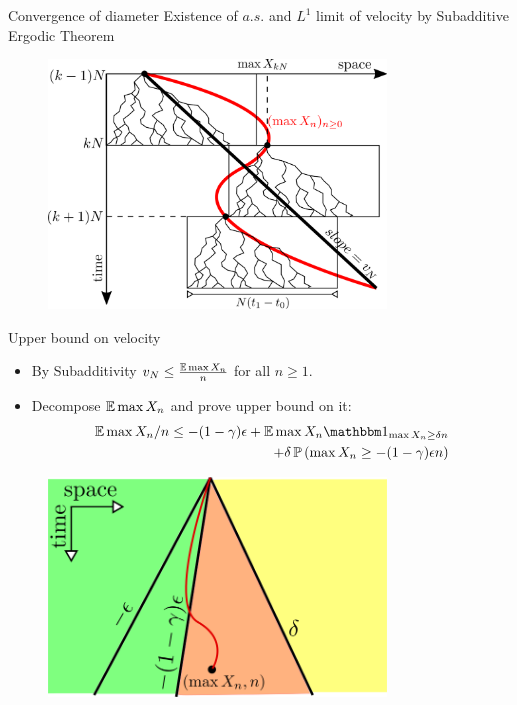 \documentclass{beamer}
\begin{document}
\begin{frame}{Convergence of diameter}
Existence of $a.s.$ and $L^1$ limit of velocity by Subadditive Ergodic Theorem

\begin{figure}
\includegraphics[width=0.8\textwidth]{graphics/g1.png}
\end{figure}

\end{frame}




\begin{frame}{Upper bound on velocity}
\begin{itemize}
\item By Subadditivity $v_N \leq \frac{\mathbb{E} \max X_n}{n}$ for all $n \geq 1$. 
\item Decompose $\mathbb{E} \max X_n$ and prove upper bound on it: 
\begin{align*}
\E \max X_n / n \leq - (1-\gamma)\epsilon + \E \max X_n \Ind_{\max X_n \geq \delta n} \\
+ \delta\, \Pr{\max X_n \geq -(1-\gamma) \epsilon n}
\end{align*}
\end{itemize}

\begin{figure}
\includegraphics[width=0.8\textwidth]{graphics/decomposition.png}
\end{figure}
\end{frame}
\end{document}
